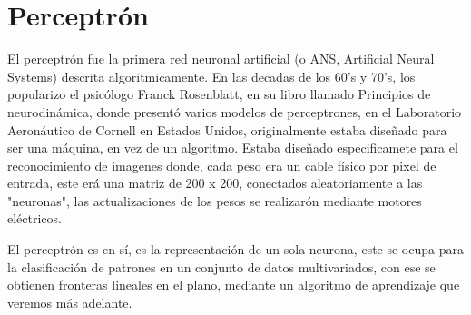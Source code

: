 \section{Perceptrón}

El perceptrón fue la primera red neuronal artificial (o ANS, Artificial Neural Systems) descrita algoritmicamente. En las decadas de los 60's y 70's, los popularizo el psicólogo Franck Rosenblatt, en su libro llamado Principios de neurodinámica, donde presentó varios modelos de perceptrones, en el Laboratorio Aeronáutico de Cornell en Estados Unidos, originalmente estaba diseñado para ser una máquina, en vez de un algoritmo. Estaba diseñado especificamete para el reconocimiento de imagenes donde, cada peso era un cable físico por pixel de entrada, este erá una matriz de 200 x 200, conectados aleatoriamente a las "neuronas", las actualizaciones de los pesos se realizarón mediante motores eléctricos. 

El perceptrón es en sí, es la representación de un sola neurona, este se ocupa para la clasificación de patrones en un conjunto de datos multivariados, con ese se obtienen fronteras lineales en el plano, mediante un algoritmo de aprendizaje que veremos más adelante.

